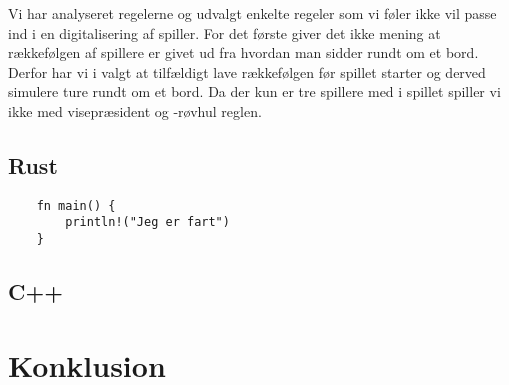 \documentclass[a4paper, 12pt]{article}
\begin{document}
Vi har analyseret regelerne og udvalgt enkelte regeler som vi føler ikke vil passe ind i en digitalisering af spiller. For det første giver det ikke mening at rækkefølgen af spillere er givet ud fra hvordan man sidder rundt om et bord. Derfor har vi i valgt at tilfældigt lave rækkefølgen før spillet starter og derved simulere ture rundt om et bord. Da der kun er tre spillere med i spillet spiller vi ikke med visepræsident og -røvhul reglen.

\subsection{Rust}


\begin{verbatim}
	fn main() {
		println!("Jeg er fart")
	}
\end{verbatim}


\subsection{C++}



\vfill
\pagebreak

\section{Konklusion}

\vfill
\pagebreak
\end{document}
